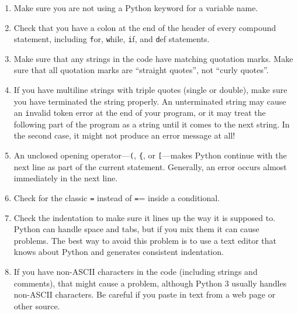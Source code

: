 \documentclass[
DIV=11,
fontsize=12,
twoside,
headinclude=false,
titlepage=firstiscover,
abstract=true,
headsepline=true,
footsepline=true,
chapterprefix=true, %
headings=big,
bibliography=totoc,%
captions=tableheading
]{scrbook}
\theoremstyle{definition}
\begin{document}
\begin{enumerate}

\item Make sure you are not using a Python keyword for a variable name.

\item Check that you have a colon at the end of the header of every
compound statement, including {\texttt for}, {\texttt while},
{\texttt if}, and {\texttt def} statements.

\item Make sure that any strings in the code have matching
quotation marks.  Make sure that all quotation marks are
``straight quotes'', not ``curly quotes''.

\item If you have multiline strings with triple quotes (single or double), make
sure you have terminated the string properly.  An unterminated string
may cause an {\texttt invalid token} error at the end of your program,
or it may treat the following part of the program as a string until it
comes to the next string.  In the second case, it might not produce an error
message at all!

\item An unclosed opening operator---\verb+(+, \verb+{+, or
  \verb+[+---makes Python continue with the next line as part of the
  current statement.  Generally, an error occurs almost immediately in
  the next line.

\item Check for the classic {\texttt =} instead of {\texttt ==} inside
a conditional.

\item Check the indentation to make sure it lines up the way it
is supposed to.  Python can handle space and tabs, but if you mix
them it can cause problems.  The best way to avoid this problem
is to use a text editor that knows about Python and generates
consistent indentation.

\item If you have non-ASCII characters in the code (including strings
and comments), that might cause a problem, although Python 3 usually
handles non-ASCII characters.  Be careful if you paste in text from
a web page or other source.

\end{enumerate}
\end{document}
